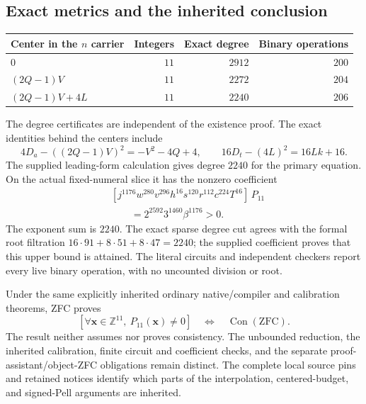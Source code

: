\subsection{Exact metrics and the inherited conclusion}

\begin{center}
\begin{tabular}{lrrr}
Center in the $n$ carrier & Integers & Exact degree & Binary operations\\
\hline
$0$ & $11$ & $2912$ & $200$\\
$(2Q-1)V$ & $11$ & $2272$ & $204$\\
$(2Q-1)V+4L$ & $11$ & $2240$ & $206$
\end{tabular}
\end{center}

The degree certificates are independent of the existence proof.
The exact identities behind the centers include
\[
 4D_a-((2Q-1)V)^2=-V^2-4Q+4,\qquad
 16D_t-(4L)^2=16Lk+16.
\]
The supplied leading-form calculation gives degree $2240$ for the
primary equation. On the actual fixed-numeral slice it has the
nonzero coefficient
\begin{align*}
 &[j^{1176}w^{280}v^{296}h^{16}s^{120}r^{112}c^{224}T^{16}]\,P_{11}\\
 &\hspace{2em}=2^{2592}3^{1460}\beta^{1176}>0.
\end{align*}
The exponent sum is $2240$. The exact sparse degree cut agrees with the
formal root filtration $16\cdot91+8\cdot51+8\cdot47=2240$;
the supplied coefficient proves that this upper bound is attained.
The literal circuits and independent checkers
report every live binary operation, with no uncounted division or root.

Under the same explicitly inherited ordinary native/compiler and
calibration theorems, ZFC proves
\[
 [\forall\mathbf x\in\mathbb Z^{11},\ P_{11}(\mathbf x)\ne0]
 \quad\Longleftrightarrow\quad\operatorname{Con}(\mathrm{ZFC}).
\]
The result neither assumes nor proves consistency. The unbounded
reduction, the inherited calibration, finite circuit and coefficient
checks, and the separate proof-assistant/object-ZFC obligations remain
distinct. The complete local source pins and retained notices identify
which parts of the interpolation, centered-budget, and signed-Pell
arguments are inherited.
